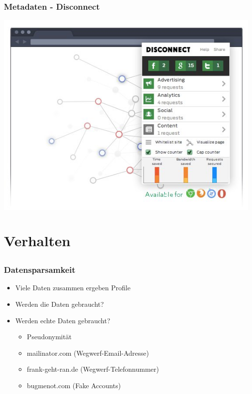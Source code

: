 \documentclass[12pt]{beamer}
\begin{document}
\begin{frame}
  \frametitle{Metadaten - Disconnect}
  \includegraphics[height=0.7\textheight]{img/disconnectme.jpg}
\end{frame}

\section{Verhalten}
\subsection{}

\begin{frame}
    \frametitle{Datensparsamkeit}
    \begin{itemize}
        \item<2-> Viele Daten zusammen ergeben Profile
        \item<3-> Werden die Daten gebraucht?
        \item<4-> Werden echte Daten gebraucht?
            \begin{itemize}
              \item<5-> Pseudonymität
              \item<6-> mailinator.com (Wegwerf-Email-Adresse)
              \item<7-> frank-geht-ran.de (Wegwerf-Telefonnummer)
              \item<8-> bugmenot.com (Fake Accounts)
            \end{itemize}
    \end{itemize}
\end{frame}
\end{document}
